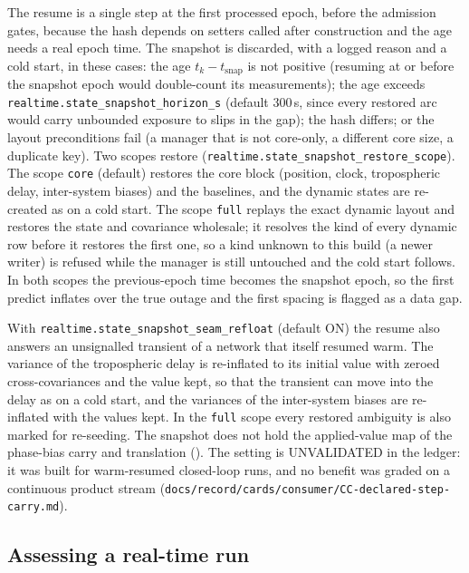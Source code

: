 \documentclass[main.tex]{subfiles}
\begin{document}
The resume is a single step at the first processed epoch, before the admission
gates, because the hash depends on setters called after construction and the age
needs a real epoch time.  The snapshot is discarded, with a logged reason and a
cold start, in these cases: the age $t_k - t_{\mathrm{snap}}$ is not positive
(resuming at or before the snapshot epoch would double-count its measurements);
the age exceeds \texttt{realtime.state\_snapshot\_horizon\_s} (default
$300$\,s, since every restored arc would carry unbounded exposure to slips in the
gap); the hash differs; or the layout preconditions fail (a manager that is not
core-only, a different core size, a duplicate key).  Two scopes restore
(\texttt{realtime.state\_snapshot\_restore\_scope}).  The scope \texttt{core}
(default) restores the core block (position, clock, tropospheric delay,
inter-system biases) and the baselines, and the dynamic states are re-created as
on a cold start.  The scope \texttt{full} replays the exact dynamic layout and
restores the state and covariance wholesale; it resolves the kind of every
dynamic row before it restores the first one, so a kind unknown to this build
(a newer writer) is refused while the manager is still untouched and the cold
start follows.  In both scopes the previous-epoch time becomes the snapshot
epoch, so the first predict inflates over the true outage and the first spacing
is flagged as a data gap.

With \texttt{realtime.state\_snapshot\_seam\_refloat} (default ON) the resume
also answers an unsignalled transient of a network that itself resumed warm.
The variance of the tropospheric delay is re-inflated to its initial value with
zeroed cross-covariances and the value kept, so that the transient can move into
the delay as on a cold start, and the variances of the inter-system biases are
re-inflated with the values kept.  In the \texttt{full} scope every restored
ambiguity is also marked for re-seeding.  The snapshot does not hold the
applied-value map of the phase-bias carry and translation
().  The setting is
UNVALIDATED in the ledger: it was built for warm-resumed closed-loop runs, and
no benefit was graded on a continuous product stream
(\texttt{docs/record/cards/consumer/CC-declared-step-carry.md}).

\subsection{Assessing a real-time run}\label{sec:rt-assess}
\end{document}

